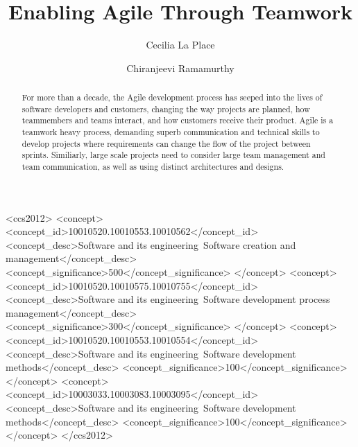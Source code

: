 \documentclass[sigplan,screen]{acmart}
\begin{document}
%
\title{Enabling Agile Through Teamwork}

%
\author{Cecilia La Place}
\author{Chiranjeevi Ramamurthy}
\authornotemark[1]

%
\renewcommand{\shortauthors}{La Place and Ramamurthy}

%
\begin{abstract}
For more than a decade, the Agile development process has seeped into the lives of software developers and customers, changing the way projects are planned, how teammembers and teams interact, and how customers receive their product. Agile is a teamwork heavy process, demanding superb communication and technical skills to develop projects where requirements can change the flow of the project between sprints. Similiarly, large scale projects need to consider large team management and team communication, as well as using distinct architectures and designs. 
\end{abstract}

%
%
\begin{CCSXML}
<ccs2012>
 <concept>
  <concept_id>10010520.10010553.10010562</concept_id>
  <concept_desc>Software and its engineering~Software creation and management</concept_desc>
  <concept_significance>500</concept_significance>
 </concept>
 <concept>
  <concept_id>10010520.10010575.10010755</concept_id>
  <concept_desc>Software and its engineering~Software development process management</concept_desc>
  <concept_significance>300</concept_significance>
 </concept>
 <concept>
  <concept_id>10010520.10010553.10010554</concept_id>
  <concept_desc>Software and its engineering~Software development methods</concept_desc>
  <concept_significance>100</concept_significance>
 </concept>
 <concept>
  <concept_id>10003033.10003083.10003095</concept_id>
  <concept_desc>Software and its engineering~Software development methods</concept_desc>
  <concept_significance>100</concept_significance>
 </concept>
</ccs2012>
\end{CCSXML}
\end{document}

